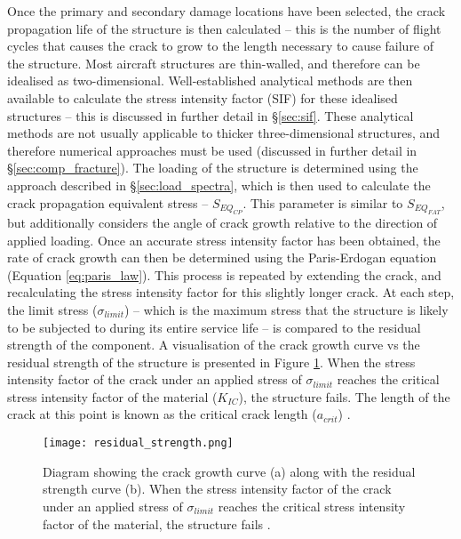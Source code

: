 Once the primary and secondary damage locations have been selected, the crack propagation life of the structure is then calculated -- this is the number of flight cycles that causes the crack to grow to the length necessary to cause failure of the structure. Most aircraft structures are thin-walled, and therefore can be idealised as two-dimensional. Well-established analytical methods are then available to calculate the stress intensity factor (SIF) for these idealised structures -- this is discussed in further detail in \S\ref{sec:sif}. These analytical methods are not usually applicable to thicker three-dimensional structures, and therefore numerical approaches must be used (discussed in further detail in \S\ref{sec:comp_fracture}). The loading of the structure is determined using the approach described in \S\ref{sec:load_spectra}, which is then used to calculate the crack propagation equivalent stress -- $S_{EQ_{CP}}$. This parameter is similar to $S_{EQ_{FAT}}$, but additionally considers the angle of crack growth relative to the direction of applied loading. Once an accurate stress intensity factor has been obtained, the rate of crack growth can then be determined using the Paris-Erdogan equation (Equation \ref{eq:paris_law}). This process is repeated by extending the crack, and recalculating the stress intensity factor for this slightly longer crack. At each step, the limit stress ($\sigma_{limit}$) -- which is the maximum stress that the structure is likely to be subjected to during its entire service life -- is compared to the residual strength of the component. A visualisation of the crack growth curve vs the residual strength of the structure is presented in Figure \ref{fig:residual_strength}. When the stress intensity factor of the crack under an applied stress of $\sigma_{limit}$ reaches the critical stress intensity factor of the material ($K_{IC}$), the structure fails. The length of the crack at this point is known as the critical crack length ($a_{crit}$) \cite{afgrow_dtdhandbook_nodate-1}.

\begin{figure}[H]
	\centering
	\texttt{[image: residual\_strength.png]}
	\caption{Diagram showing the crack growth curve (a) along with the residual strength curve (b). When the stress intensity factor of the crack under an applied stress of $\sigma_{limit}$ reaches the critical stress intensity factor of the material, the structure fails \cite{dzidowski_effect_2013}.}
	\label{fig:residual_strength}
\end{figure}

